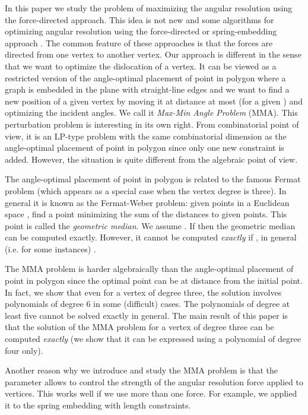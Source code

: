 \documentclass[10pt]{article}
\begin{document}
In this paper we study the problem of maximizing the angular resolution using the force-directed approach.  This idea is not new and some algorithms for optimizing angular resolution using the force-directed or spring-embedding approach \cite{abs-mtrg-10,ccgkt-11}. The common feature of these approaches is that the forces  are directed from one vertex to another vertex. 
Our approach is different in the sense that we want to optimize the dislocation of a vertex. 
It can be viewed as a restricted version of the angle-optimal placement of point in polygon
where a graph is embedded in the plane with straight-line edges and we want to find a new position of a given vertex by moving it at distance at most  (for a given ) and optimizing the incident angles. We call it {\em Max-Min Angle Problem} (MMA). 
This perturbation  problem is interesting in its own right. 
From combinatorial point of view, it is an LP-type problem with the same combinatorial 
dimension as the angle-optimal placement of point in polygon \cite{msw-96} since only one 
new constraint is added. However, the situation is quite different from the 
algebraic point of view.

The angle-optimal placement of point in polygon is related to the famous Fermat problem (which appears as a special case when the vertex degree is three). In general it is known as 
the Fermat-Weber problem: given  points in a Euclidean space , find a point minimizing the sum of the distances to  given points. This point is called the {\em geometric median}. We assume . 
If  then the geometric median can be computed exactly. However, it cannot be computed {\em exactly} if , in general (i.e. for some instances) \cite{b-ad-88}.  

The MMA problem is harder algebraically than the angle-optimal placement of point in polygon since the optimal point can be at distance  from the initial point. 
In fact, we show that even for a vertex of degree three,  the solution involves polynomials of degree 6 in some (difficult) cases. The polynomials of degree at least five  cannot be solved exactly in general. The main result of this paper is that  the solution of the MMA problem for a vertex of degree three can be computed {\em exactly} (we show that it can be expressed using a polynomial of degree four only).

Another reason why we introduce and study the MMA problem is that the parameter  allows to control the strength of the angular resolution force applied to vertices. This works well if we use more than one force. For example, we applied it to the spring embedding with length constraints. 
\end{document}

